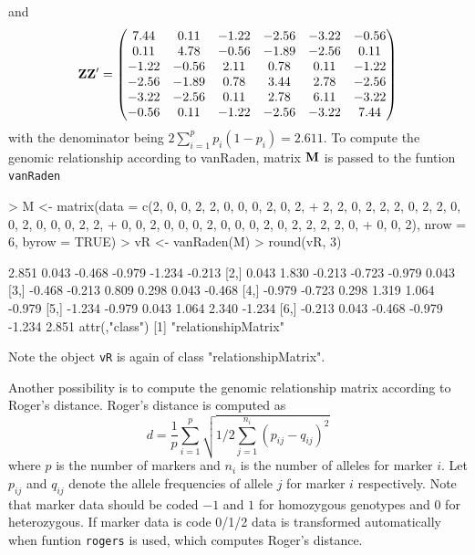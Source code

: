 \documentclass[a4paper,11pt]{article}
\begin{document}
  and 
  $$ \bf Z \bf Z ' = \begin{pmatrix}  
   7.44 & 0.11 & -1.22 & -2.56 & -3.22 & -0.56 \\ 
   0.11 & 4.78 & -0.56 & -1.89 & -2.56 & 0.11 \\ 
   -1.22 & -0.56 & 2.11 & 0.78 & 0.11 & -1.22 \\ 
   -2.56 & -1.89 & 0.78 & 3.44 & 2.78 & -2.56 \\ 
   -3.22 & -2.56 & 0.11 & 2.78 & 6.11 & -3.22 \\ 
   -0.56 & 0.11 & -1.22 & -2.56 & -3.22 & 7.44 \\
     \end{pmatrix}
  $$  
with the denominator being $2\sum_{i=1}^p p_i(1-p_i)=2.611$. To compute the genomic relationship according to vanRaden, matrix $\bf M$ is passed to the funtion \texttt{vanRaden}  
\begin{Schunk}
\begin{Sinput}
> M <- matrix(data = c(2, 0, 0, 2, 2, 0, 0, 0, 2, 0, 2, 
+     2, 2, 0, 2, 2, 2, 0, 2, 2, 0, 0, 2, 0, 0, 0, 2, 2, 
+     0, 0, 2, 0, 0, 0, 2, 0, 0, 0, 2, 0, 2, 2, 2, 2, 0, 
+     0, 0, 2), nrow = 6, byrow = TRUE)
> vR <- vanRaden(M)
> round(vR, 3)
\end{Sinput}
\begin{Soutput}
       [,1]   [,2]   [,3]   [,4]   [,5]   [,6]
[1,]  2.851  0.043 -0.468 -0.979 -1.234 -0.213
[2,]  0.043  1.830 -0.213 -0.723 -0.979  0.043
[3,] -0.468 -0.213  0.809  0.298  0.043 -0.468
[4,] -0.979 -0.723  0.298  1.319  1.064 -0.979
[5,] -1.234 -0.979  0.043  1.064  2.340 -1.234
[6,] -0.213  0.043 -0.468 -0.979 -1.234  2.851
attr(,"class")
[1] "relationshipMatrix"
\end{Soutput}
\end{Schunk}
Note the object \texttt{vR} is again of class "relationshipMatrix".    

Another possibility is to compute the genomic relationship matrix according to Roger's distance. Roger's distance is computed as 
\begin{equation}
d=\frac{1}{p}\sum_{i=1}^p \sqrt{1/2 \sum_{j=1}^{n_i}(p_{ij}-q_{ij})^2}
\end{equation}
where $p$ is the number of markers and $n_i$ is the number of alleles for marker $i$. Let $p_{ij}$ and $q_{ij}$ denote the allele frequencies of allele $j$ for marker $i$ respectively. Note that marker data should be coded $-1$ and $1$ for homozygous genotypes and 0 for heterozygous. If marker data is code 0/1/2 data is transformed automatically
when funtion \texttt{rogers} is used, which computes Roger's distance.  
\end{document}
